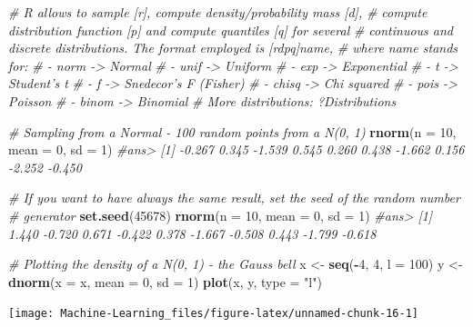 \documentclass[]{book}
\newenvironment{Shaded}{\begin{snugshade}}{\end{snugshade}}
\newcommand{\KeywordTok}[1]{\textcolor[rgb]{0.13,0.29,0.53}{\textbf{#1}}}
\newcommand{\DataTypeTok}[1]{\textcolor[rgb]{0.13,0.29,0.53}{#1}}
\newcommand{\DecValTok}[1]{\textcolor[rgb]{0.00,0.00,0.81}{#1}}
\newcommand{\StringTok}[1]{\textcolor[rgb]{0.31,0.60,0.02}{#1}}
\newcommand{\CommentTok}[1]{\textcolor[rgb]{0.56,0.35,0.01}{\textit{#1}}}
\newcommand{\OperatorTok}[1]{\textcolor[rgb]{0.81,0.36,0.00}{\textbf{#1}}}
\newcommand{\NormalTok}[1]{#1}
\theoremstyle{definition}
\theoremstyle{definition}
\theoremstyle{definition}
\theoremstyle{remark}
\begin{document}
\begin{Shaded}
\begin{Highlighting}[]
\CommentTok{# R allows to sample [r], compute density/probability mass [d],}
\CommentTok{# compute distribution function [p] and compute quantiles [q] for several}
\CommentTok{# continuous and discrete distributions. The format employed is [rdpq]name,}
\CommentTok{# where name stands for:}
\CommentTok{# - norm -> Normal}
\CommentTok{# - unif -> Uniform}
\CommentTok{# - exp -> Exponential}
\CommentTok{# - t -> Student's t}
\CommentTok{# - f -> Snedecor's F (Fisher)}
\CommentTok{# - chisq -> Chi squared}
\CommentTok{# - pois -> Poisson}
\CommentTok{# - binom -> Binomial}
\CommentTok{# More distributions: ?Distributions}


\CommentTok{# Sampling from a Normal - 100 random points from a N(0, 1)}
\KeywordTok{rnorm}\NormalTok{(}\DataTypeTok{n =} \DecValTok{10}\NormalTok{, }\DataTypeTok{mean =} \DecValTok{0}\NormalTok{, }\DataTypeTok{sd =} \DecValTok{1}\NormalTok{)}
\CommentTok{#ans>  [1] -0.267  0.345 -1.539  0.545  0.260  0.438 -1.662  0.156 -2.252 -0.450}

\CommentTok{# If you want to have always the same result, set the seed of the random number}
\CommentTok{# generator}
\KeywordTok{set.seed}\NormalTok{(}\DecValTok{45678}\NormalTok{)}
\KeywordTok{rnorm}\NormalTok{(}\DataTypeTok{n =} \DecValTok{10}\NormalTok{, }\DataTypeTok{mean =} \DecValTok{0}\NormalTok{, }\DataTypeTok{sd =} \DecValTok{1}\NormalTok{)}
\CommentTok{#ans>  [1]  1.440 -0.720  0.671 -0.422  0.378 -1.667 -0.508  0.443 -1.799 -0.618}

\CommentTok{# Plotting the density of a N(0, 1) - the Gauss bell}
\NormalTok{x <-}\StringTok{ }\KeywordTok{seq}\NormalTok{(}\OperatorTok{-}\DecValTok{4}\NormalTok{, }\DecValTok{4}\NormalTok{, }\DataTypeTok{l =} \DecValTok{100}\NormalTok{)}
\NormalTok{y <-}\StringTok{ }\KeywordTok{dnorm}\NormalTok{(}\DataTypeTok{x =}\NormalTok{ x, }\DataTypeTok{mean =} \DecValTok{0}\NormalTok{, }\DataTypeTok{sd =} \DecValTok{1}\NormalTok{)}
\KeywordTok{plot}\NormalTok{(x, y, }\DataTypeTok{type =} \StringTok{"l"}\NormalTok{)}
\end{Highlighting}
\end{Shaded}

\begin{center}\texttt{[image: Machine-Learning\_files/figure-latex/unnamed-chunk-16-1]} \end{center}
\end{document}
